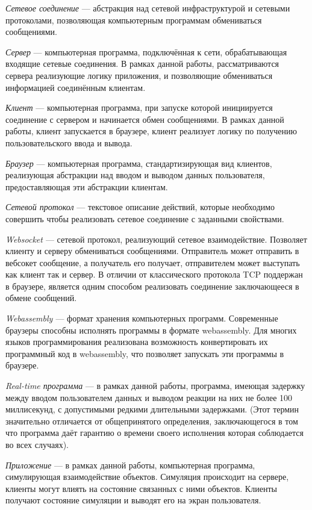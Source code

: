 \documentclass[a4paper,14pt, openany]{book}
\begin{document}
\emph{Сетевое соединение} --- абстракция над сетевой инфраструктурой и сетевыми протоколами, позволяющая компьютерным программам обмениваться сообщениями.

\emph{Сервер} --- компьютерная программа, подключённая к сети,  обрабатывающая входящие сетевые соединения. В рамках данной работы, рассматриваются сервера реализующие логику приложения, и позволяющие обмениваться информацией соединённым клиентам. 

\emph{Клиент} --- компьютерная программа, при запуске которой инициируется соединение с сервером и начинается обмен сообщениями. В рамках данной работы, клиент запускается в браузере, клиент реализует логику по получению пользовательского ввода и вывода.

\emph{Браузер} --- компьютерная программа, стандартизирующая вид клиентов, реализующая абстракции над вводом и выводом данных пользователя, предоставляющая эти абстракции клиентам.

\emph{Сетевой протокол} --- текстовое описание действий, которые необходимо совершить чтобы реализовать сетевое соединение с заданными свойствами.

\emph{Websocket \cite{websocket}} --- сетевой протокол, реализующий сетевое взаимодействие. Позволяет клиенту и серверу обмениваться сообщениями. Отправитель может отправить в вебсокет сообщение, а получатель его получает, отправителем может выступать как клиент так и сервер. В отличии от классического протокола TCP поддержан в браузере, является одним способом реализовать соединение заключающееся в обмене сообщений.

\emph{Webassembly \cite{webassembly}} --- формат хранения компьютерных программ. Современные браузеры способны исполнять программы в формате webassembly. Для многих языков программирования реализована возможность конвертировать их программный код в webassembly, что позволяет запускать эти программы в браузере.

\emph{Real-time программа} --- в рамках данной работы, программа, имеющая задержку между вводом пользователем данных и выводом реакции на них не более 100 миллисекунд, с допустимыми редкими длительными задержками. (Этот термин значительно отличается от общепринятого определения, заключающегося в том что программа даёт гарантию о времени своего исполнения которая соблюдается во всех случаях). 

\emph{Приложение} --- в рамках данной работы, компьютерная программа, симулирующая взаимодействие объектов. Симуляция происходит на сервере, клиенты могут влиять на состояние связанных с ними объектов. Клиенты получают состояние симуляции и выводят его на экран пользователя.
\end{document}
